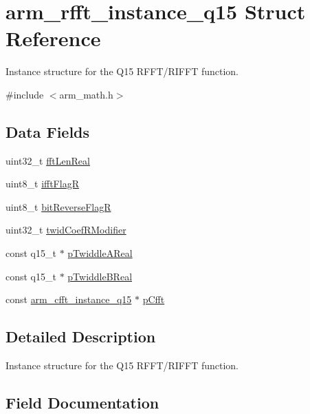 \hypertarget{structarm__rfft__instance__q15}{}\section{arm\+\_\+rfft\+\_\+instance\+\_\+q15 Struct Reference}
\label{structarm__rfft__instance__q15}


Instance structure for the Q15 R\+F\+F\+T/\+R\+I\+F\+FT function.  




{\ttfamily \#include $<$arm\+\_\+math.\+h$>$}

\subsection*{Data Fields}
\begin{DoxyCompactItemize}
\item 
uint32\+\_\+t \mbox{\hyperlink{structarm__rfft__instance__q15_adf0d4604cf5546075d9d4cf122d6c986}{fft\+Len\+Real}}
\item 
uint8\+\_\+t \mbox{\hyperlink{structarm__rfft__instance__q15_a787d72055c89e4d62b188d6bd646341c}{ifft\+FlagR}}
\item 
uint8\+\_\+t \mbox{\hyperlink{structarm__rfft__instance__q15_ad56ec2425e2422108b8767b43d944591}{bit\+Reverse\+FlagR}}
\item 
uint32\+\_\+t \mbox{\hyperlink{structarm__rfft__instance__q15_a5b06f7f76c018db993fe6acc5708c589}{twid\+Coef\+R\+Modifier}}
\item 
const q15\+\_\+t $\ast$ \mbox{\hyperlink{structarm__rfft__instance__q15_a8d14d45dce27a9a467f9f482d3397a5a}{p\+Twiddle\+A\+Real}}
\item 
const q15\+\_\+t $\ast$ \mbox{\hyperlink{structarm__rfft__instance__q15_a19474a01d3d1784e3447c140d8c30f19}{p\+Twiddle\+B\+Real}}
\item 
const \mbox{\hyperlink{structarm__cfft__instance__q15}{arm\+\_\+cfft\+\_\+instance\+\_\+q15}} $\ast$ \mbox{\hyperlink{structarm__rfft__instance__q15_abd0c3c04ec88379f48e51447e95f092a}{p\+Cfft}}
\end{DoxyCompactItemize}


\subsection{Detailed Description}
Instance structure for the Q15 R\+F\+F\+T/\+R\+I\+F\+FT function. 

\subsection{Field Documentation}
\mbox{\label{structarm__rfft__instance__q15_ad56ec2425e2422108b8767b43d944591}} 
